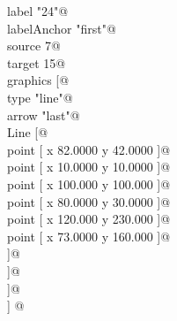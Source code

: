 \documentclass[a4paper]{report}
\begin{document}
\begin{flushleft}
\begin{minipage}{\linewidth}
\begin{list}{}{}
\mbox{}\verb@ label "24"@\\
\mbox{}\verb@ labelAnchor "first"@\\
\mbox{}\verb@ source 7@\\
\mbox{}\verb@ target 15@\\
\mbox{}\verb@ graphics [@\\
\mbox{}\verb@ type "line"@\\
\mbox{}\verb@ arrow "last"@\\
\mbox{}\verb@ Line [@\\
\mbox{}\verb@ point [ x 82.0000 y 42.0000 ]@\\
\mbox{}\verb@ point [ x 10.0000 y 10.0000 ]@\\
\mbox{}\verb@ point [ x 100.000 y 100.000 ]@\\
\mbox{}\verb@ point [ x 80.0000 y 30.0000 ]@\\
\mbox{}\verb@ point [ x 120.000 y 230.000 ]@\\
\mbox{}\verb@ point [ x 73.0000 y 160.000 ]@\\
\mbox{}\verb@ ]@\\
\mbox{}\verb@ ]@\\
\mbox{}\verb@ ]@\\
\mbox{}\verb@] @\\
\mbox{}\verb@@{\NWsep}
\end{list}
\vspace{-1.5ex}
\footnotesize
\begin{list}{}{\setlength{\itemsep}{-\parsep}\setlength{\itemindent}{-\leftmargin}}

\item{}
\end{list}
\end{minipage}\vspace{4ex}
\end{flushleft}
\end{document}
